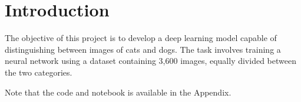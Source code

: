 \section{Introduction}
The objective of this project is to develop a deep learning model capable of distinguishing between images of cats and dogs.
The task involves training a neural network using a dataset containing 3,600 images, equally divided between the two categories.

Note that the code and notebook is available in the Appendix.

